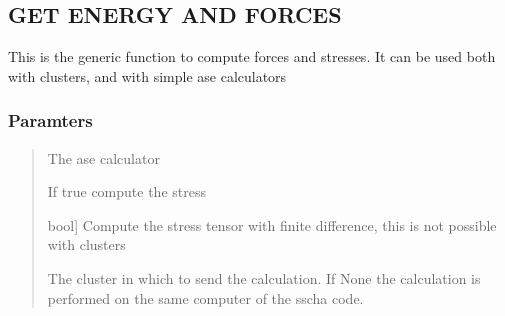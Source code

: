 \documentclass[a4paper,11pt,english]{sphinxmanual}
\begin{document}
\begin{fulllineitems}
\label{\detokenize{apireference:sscha.Ensemble.Ensemble}}
\pysigstartsignatures
{}
\pysigstopsignatures{}

\begin{fulllineitems}
\label{\detokenize{apireference:sscha.Ensemble.Ensemble.compute_ensemble}}
\pysigstartsignatures
{}
\pysigstopsignatures

\subsection{GET ENERGY AND FORCES}
\label{\detokenize{apireference:get-energy-and-forces}}
\sphinxAtStartPar
This is the generic function to compute forces and stresses.
It can be used both with clusters, and with simple ase calculators


\subsubsection{Paramters}
\label{\detokenize{apireference:paramters}}\begin{quote}
\begin{description}
\sphinxAtStartPar
The ase calculator

\sphinxAtStartPar
If true compute the stress

\sphinxlineitem{stress\_numerical}{[}bool{]}
\sphinxAtStartPar
Compute the stress tensor with finite difference,
this is not possible with clusters

\sphinxAtStartPar
The cluster in which to send the calculation.
If None the calculation is performed on the same computer of
the sscha code.


\end{description}
\end{quote}
\end{fulllineitems}
\end{fulllineitems}
\end{document}
